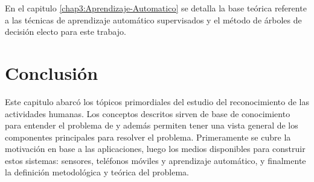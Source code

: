 En el capitulo \ref{chap3:Aprendizaje-Automatico} se detalla la base
teórica referente a las técnicas de aprendizaje automático supervisados
y el método de árboles de decisión electo para este trabajo.

\section{Conclusión}

\label{sec27:conclusion}Este capitulo abarcó los tópicos primordiales
del estudio del reconocimiento de las actividades humanas. Los conceptos
descritos sirven de base de conocimiento para entender el problema
de  y además permiten tener una vista general de los componentes
principales para resolver el problema. Primeramente se cubre la motivación
en base a las aplicaciones, luego los medios disponibles para construir
estos sistemas: sensores, teléfonos móviles y aprendizaje automático,
y finalmente la definición metodológica y teórica del problema. 
